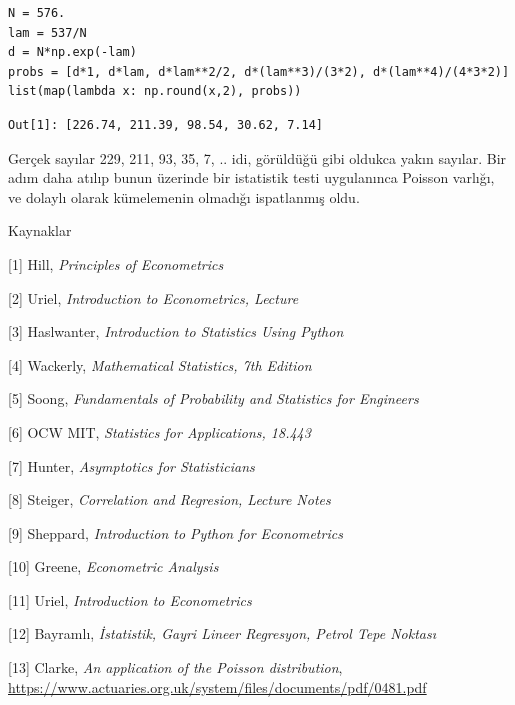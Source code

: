 \documentclass[12pt,fleqn]{article}\usepackage{../../common}
\begin{document}
\begin{verbatim}
N = 576.
lam = 537/N
d = N*np.exp(-lam)
probs = [d*1, d*lam, d*lam**2/2, d*(lam**3)/(3*2), d*(lam**4)/(4*3*2)]
list(map(lambda x: np.round(x,2), probs))
\end{verbatim}

\begin{verbatim}
Out[1]: [226.74, 211.39, 98.54, 30.62, 7.14]
\end{verbatim}

Gerçek sayılar 229, 211, 93, 35, 7, .. idi, görüldüğü gibi oldukca yakın
sayılar. Bir adım daha atılıp bunun üzerinde bir istatistik testi
uygulanınca Poisson varlığı, ve dolaylı olarak kümelemenin olmadığı ispatlanmış
oldu.

Kaynaklar

[1] Hill, {\em Principles of Econometrics}

[2] Uriel, {\em Introduction to Econometrics, Lecture}

[3] Haslwanter, {\em Introduction to Statistics Using Python}

[4] Wackerly, {\em Mathematical Statistics, 7th Edition}

[5] Soong, {\em Fundamentals of Probability and Statistics for Engineers}

[6] OCW MIT, {\em Statistics for Applications, 18.443}

[7] Hunter, {\em Asymptotics for Statisticians}

[8] Steiger, {\em Correlation and Regresion, Lecture Notes}

[9] Sheppard, {\em Introduction to Python for Econometrics}

[10] Greene, {\em Econometric Analysis}

[11] Uriel, {\em Introduction to Econometrics}

[12] Bayramlı, {\em İstatistik, Gayri Lineer Regresyon, Petrol Tepe Noktası}

[13] Clarke, {\em An application of the Poisson distribution},
     \url{https://www.actuaries.org.uk/system/files/documents/pdf/0481.pdf}
\end{document}
